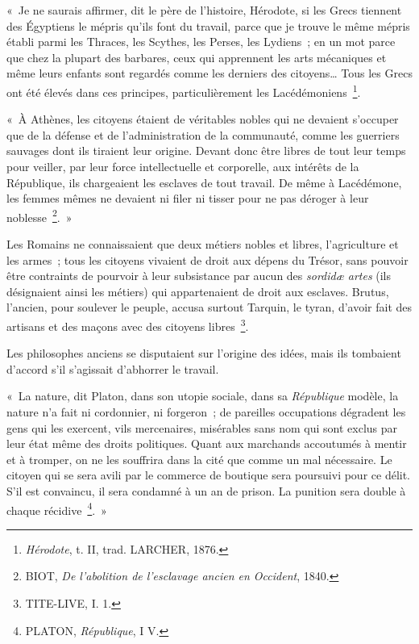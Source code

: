 \documentclass[french,twoside]{book} %
\newenvironment{quoteblock}%
  {\begin{quoting}}
  {\end{quoting}}
\newenvironment{quotebar}{%
    \def\FrameCommand{{\color{rubric!10!}\vrule width 0.5em} \hspace{0.9em}}%
    \def\OuterFrameSep{\itemsep} %
    \MakeFramed {\advance\hsize-\width \FrameRestore}
  }%
  {%
    \endMakeFramed
  }
\renewenvironment{quoteblock}%
  {%
    \savenotes
    \setstretch{0.9}
    \normalfont
    \begin{quotebar}
  }
  {%
    \end{quotebar}
    \spewnotes
  }
\begin{document}
\begin{quoteblock}
 \noindent « Je ne saurais affirmer, dit le père de l’histoire, Hérodote, si les Grecs tiennent des Égyptiens le mépris qu’ils font du travail, parce que je trouve le même mépris établi parmi les Thraces, les Scythes, les Perses, les Lydiens ; en un mot parce que chez la plupart des barbares, ceux qui apprennent les arts mécaniques et même leurs enfants sont regardés comme les derniers des citoyens… Tous les Grecs ont été élevés dans ces principes, particulièrement les Lacédémoniens \footnote{\emph{Hérodote}, t. II, trad. LARCHER, 1876.}.\par
 « À Athènes, les citoyens étaient de véritables nobles qui ne devaient s’occuper que de la défense et de l’administration de la communauté, comme les guerriers sauvages dont ils tiraient leur origine. Devant donc être libres de tout leur temps pour veiller, par leur force intellectuelle et corporelle, aux intérêts de la République, ils chargeaient les esclaves de tout travail. De même à Lacédémone, les femmes mêmes ne devaient ni filer ni tisser pour ne pas déroger à leur noblesse \footnote{BIOT, \emph{De l’abolition de l’esclavage ancien en Occident}, 1840.}. »
\end{quoteblock}

\noindent Les Romains ne connaissaient que deux métiers nobles et libres, l’agriculture et les armes ; tous les citoyens vivaient de droit aux dépens du Trésor, sans pouvoir être contraints de pourvoir à leur subsistance par aucun des \emph{sordidæ artes} (ils désignaient ainsi les métiers) qui appartenaient de droit aux esclaves. Brutus, l’ancien, pour soulever le peuple, accusa surtout Tarquin, le tyran, d’avoir fait des artisans et des maçons avec des citoyens libres \footnote{TITE-LIVE, I. 1.}.\par
Les philosophes anciens se disputaient sur l’origine des idées, mais ils tombaient d’accord s’il s’agissait d’abhorrer le travail.\par

\begin{quoteblock}
 \noindent « La nature, dit Platon, dans son utopie sociale, dans sa\emph{ République} modèle, la nature n’a fait ni cordonnier, ni forgeron ; de pareilles occupations dégradent les gens qui les exercent, vils mercenaires, misérables sans nom qui sont exclus par leur état même des droits politiques. Quant aux marchands accoutumés à mentir et à tromper, on ne les souffrira dans la cité que comme un mal nécessaire. Le citoyen qui se sera avili par le commerce de boutique sera poursuivi pour ce délit. S’il est convaincu, il sera condamné à un an de prison. La punition sera double à chaque récidive \footnote{PLATON, \emph{République}, I V.}. »
\end{quoteblock}
\end{document}
